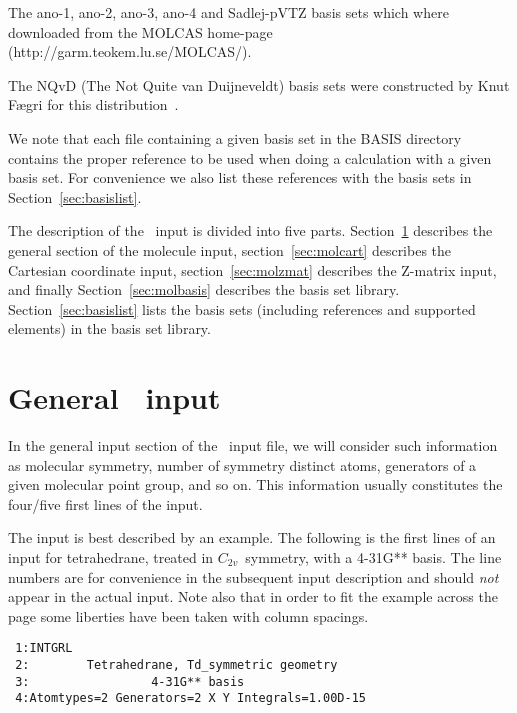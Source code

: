 \begin{list}{--}{}
\item The ano-1, ano-2, ano-3, ano-4 and Sadlej-pVTZ basis sets which where
downloaded from the MOLCAS
home-page
(http://garm.teokem.lu.se/MOLCAS/).
\item The NQvD (The Not Quite van Duijneveldt) basis sets were constructed
by Knut F\ae gri for this distribution~\cite{nqvdref}.
\end{list}

We note that each file containing a given basis set in the BASIS
directory contains the proper reference to be used when doing a 
calculation with a given basis set. For convenience we also list 
these references with the basis sets in Section~\ref{sec:basislist}.

The description of the \mol\ input is divided into five parts.
Section~\ref{sec:molgeneral} describes the general section of the
molecule input,
section~\ref{sec:molcart} describes the Cartesian coordinate
input,
section~\ref{sec:molzmat} describes the Z-matrix
input, and finally
Section~\ref{sec:molbasis} describes the basis set
library.
Section~\ref{sec:basislist} lists the basis sets (including references and supported elements) 
in the basis set library.

\section{General \mol\ input}\label{sec:molgeneral}

In the general input section of the \mol\ input file, we will consider
such information as molecular symmetry, number of
symmetry distinct atoms, generators of a
given molecular point group, and so on.
This information usually constitutes the four/five first lines of the
input.

The input is best described by an example.
The following is the first lines of an input for
tetrahedrane, treated in
$C_{2v}$~symmetry, with a 4-31G** basis.  The line numbers are for
convenience in the subsequent input description and should {\em
not} appear in the actual input.  Note also that in order to fit
the example across the page some liberties have been taken with
column spacings.
\begin{verbatim}
 1:INTGRL
 2:        Tetrahedrane, Td_symmetric geometry
 3:                 4-31G** basis
 4:Atomtypes=2 Generators=2 X Y Integrals=1.00D-15
\end{verbatim}

